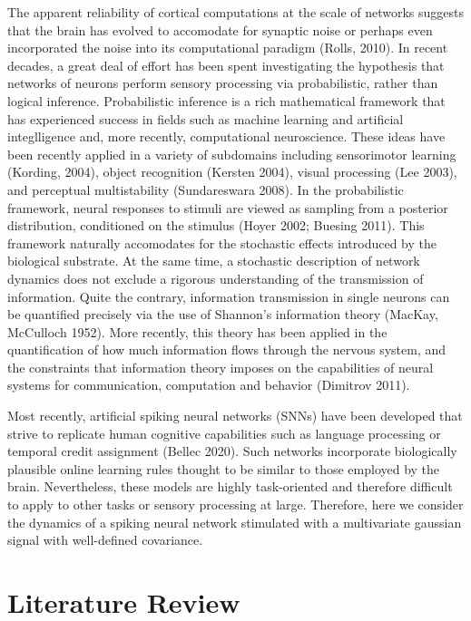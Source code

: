 \documentclass{ucetd}
\begin{document}
The apparent reliability of cortical computations at the scale of networks suggests that the brain has evolved to accomodate for synaptic noise or perhaps even incorporated the noise into its computational paradigm (Rolls, 2010). In recent decades, a great deal of effort has been spent investigating the hypothesis that networks of neurons perform sensory processing via probabilistic, rather than logical inference. Probabilistic inference is a rich mathematical framework that has experienced success in fields such as machine learning and artificial integlligence and, more recently, computational neuroscience. These ideas have been recently applied in a variety of subdomains including sensorimotor learning (Kording, 2004), object recognition (Kersten 2004), visual processing (Lee 2003), and perceptual multistability (Sundareswara 2008). In the probabilistic framework, neural responses to stimuli are viewed as sampling from a posterior distribution, conditioned on the stimulus (Hoyer 2002; Buesing 2011). This framework naturally accomodates for the stochastic effects introduced by the biological substrate. At the same time, a stochastic description of network dynamics does not exclude a rigorous understanding of the transmission of information. Quite the contrary, information transmission in single neurons can be quantified precisely via the use of Shannon's information theory (MacKay, McCulloch 1952). More recently, this theory has been applied in the quantification of how much information flows through the nervous system, and the constraints that information theory imposes on the capabilities of neural systems for communication, computation and behavior (Dimitrov 2011).

Most recently, artificial spiking neural networks (SNNs) have been developed that strive to replicate human cognitive capabilities such as language processing or temporal credit assignment (Bellec 2020). Such networks incorporate biologically plausible online learning rules thought to be similar to those employed by the brain.
Nevertheless, these models are highly task-oriented and therefore difficult to apply to other tasks or sensory processing at large. Therefore, here we consider the dynamics of a spiking neural network stimulated with a multivariate gaussian signal with well-defined covariance. 


\section{Literature Review}
\end{document}
